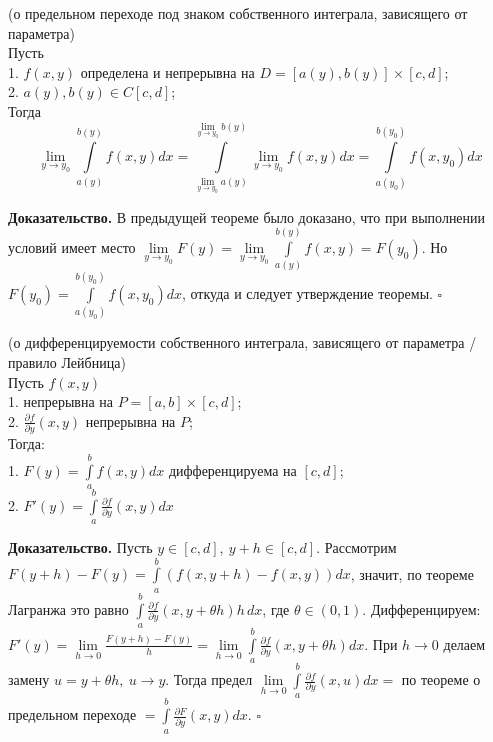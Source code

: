 \begin{theor}
    (о предельном переходе под знаком собственного интеграла, зависящего от 
    параметра)\\
    Пусть\\
    1. $f(x,y)$ определена и непрерывна на  $D=[a(y),b(y)]\times [c,d]$;\\
    2. $a(y),b(y)\in C[c,d]$;\\
    Тогда 
    $$\lim\limits_{y \to y_0}\int\limits_{a(y)}^{b(y)}f(x,y)dx=
    \int\limits_{\lim\limits_{y \to y_0}a(y) }^{\lim\limits_{y \to y_0}b(y)}
   \lim\limits_{y \to y_0}f(x,y)dx=\int\limits_{a(y_0)}^{b(y_0)}f(x,y_0)dx$$
\end{theor}
\textbf{Доказательство.} В предыдущей теореме было доказано, что при 
выполнении условий имеет место
$\lim\limits_{y \to y_0} F(y) = \lim\limits_{y\to y_0}\int\limits_{a(y)}^{b(y)}
f(x,y) = F(y_0)$. Но $F(y_0) = \int\limits_{a(y_0)}^{b(y_0)}f(x,y_0)dx$, откуда
и следует утверждение теоремы. $\square$

\begin{theor}
    (о дифференцируемости собственного интеграла, зависящего от параметра /
    правило Лейбница)\\
    Пусть $f(x,y)$ \\
    1. непрерывна на  $P=[a,b]\times[c,d]$;\\
    2. $\frac{\partial f}{\partial y}(x,y)$ непрерывна на $P$;\\
    Тогда:\\
    1. $F(y)=\int\limits_{a}^{b} f(x,y)dx$ дифференцируема на $[c,d]$;\\
    2. $F'(y)=\int\limits_{a}^{b}\frac{\partial f}{\partial y}(x,y)dx$
\end{theor}
\textbf{Доказательство.} Пусть $y\in[c,d],~y+h\in[c,d]$. 
Рассмотрим  $F(y+h)-F(y)=\int\limits_{a}^{b} (f(x,y+h)-f(x,y))dx$, 
значит, по теореме Лагранжа это равно $\int\limits_{a}^{b}
\frac{\partial f}{\partial y}(x,y+\theta h)h\,dx$, где $\theta\in(0,1)$. 
Дифференцируем:
$F'(y)=\lim\limits_{h \to 0}\frac{F(y+h)-F(y)}{h}=\lim\limits_{h \to 0}
\int\limits_{a}^{b} \frac{\partial f}{\partial y}(x,y+\theta h)dx$.
При $h\to 0$ делаем замену  $u=y+\theta h,~u\to y$. Тогда предел
 $\lim\limits_{h \to 0}
\int\limits_{a}^{b} \frac{\partial f}{\partial y}(x,u)dx=$
по теореме о предельном переходе $=\int\limits_{a}^{b}
\frac{\partial F}{\partial y}(x,y)dx$. $\square$ 

